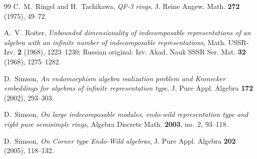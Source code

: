 \documentclass[a4paper,reqno,10pt]{amsart}
\theoremstyle{definition}
\numberwithin{equation}{section}
\begin{document}
\begin{thebibliography}{99}
C.~M.~Ringel and H.~Tachikawa,
\emph{QF-3 rings},
J. Reine Angew. Math. \textbf{272} (1975), 49--72.

A.~V.~Roiter,
\emph{Unbounded dimensionality of indecomposable representations of an
algebra with an infinite number of indecomposable representations},
Math. USSR-Izv. \textbf{2} (1968), 1223--1230; Russian original: Izv.
Akad. Nauk SSSR Ser. Mat. \textbf{32} (1968), 1275--1282.

D.~Simson,
\emph{An endomorphism algebra realization problem and Kronecker embeddings
for algebras of infinite representation type},
J. Pure Appl. Algebra \textbf{172} (2002), 293--303.

D.~Simson,
\emph{On large indecomposable modules, endo-wild representation type and right
pure semisimple rings},
Algebra Discrete Math. \textbf{2003}, no.~2, 93--118.

D.~Simson,
\emph{On Corner type Endo-Wild algebras},
J. Pure Appl. Algebra \textbf{202} (2005), 118--132.

\end{thebibliography}
\end{document}
